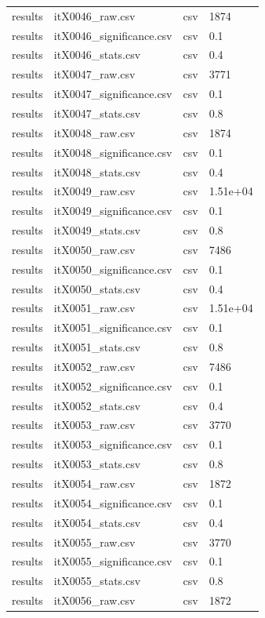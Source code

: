 \begin{landscape}
\begin{longtable}{p{}p{}p{}p{}}
results & itX0046\_raw.csv & csv & 1874 \\
results & itX0046\_significance.csv & csv & 0.1 \\
results & itX0046\_stats.csv & csv & 0.4 \\
results & itX0047\_raw.csv & csv & 3771 \\
results & itX0047\_significance.csv & csv & 0.1 \\
results & itX0047\_stats.csv & csv & 0.8 \\
results & itX0048\_raw.csv & csv & 1874 \\
results & itX0048\_significance.csv & csv & 0.1 \\
results & itX0048\_stats.csv & csv & 0.4 \\
results & itX0049\_raw.csv & csv & 1.51e+04 \\
results & itX0049\_significance.csv & csv & 0.1 \\
results & itX0049\_stats.csv & csv & 0.8 \\
results & itX0050\_raw.csv & csv & 7486 \\
results & itX0050\_significance.csv & csv & 0.1 \\
results & itX0050\_stats.csv & csv & 0.4 \\
results & itX0051\_raw.csv & csv & 1.51e+04 \\
results & itX0051\_significance.csv & csv & 0.1 \\
results & itX0051\_stats.csv & csv & 0.8 \\
results & itX0052\_raw.csv & csv & 7486 \\
results & itX0052\_significance.csv & csv & 0.1 \\
results & itX0052\_stats.csv & csv & 0.4 \\
results & itX0053\_raw.csv & csv & 3770 \\
results & itX0053\_significance.csv & csv & 0.1 \\
results & itX0053\_stats.csv & csv & 0.8 \\
results & itX0054\_raw.csv & csv & 1872 \\
results & itX0054\_significance.csv & csv & 0.1 \\
results & itX0054\_stats.csv & csv & 0.4 \\
results & itX0055\_raw.csv & csv & 3770 \\
results & itX0055\_significance.csv & csv & 0.1 \\
results & itX0055\_stats.csv & csv & 0.8 \\
results & itX0056\_raw.csv & csv & 1872 \\

\end{longtable}
\end{landscape}
